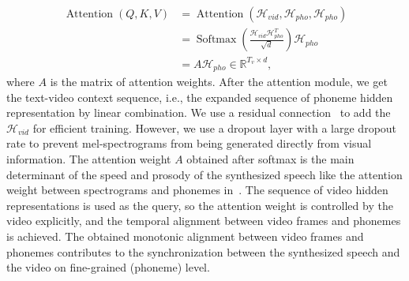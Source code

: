 \documentclass{article}
\begin{document}
\vspace{-0.5cm}
\begin{align}
\label{eq:att}
\operatorname{Attention}(Q, K, V) 
&= \operatorname{Attention}\left(\mathcal{H}_{vid} , \mathcal{H}_{pho} , \mathcal{H}_{pho} \right) \\ 
&= \operatorname{Softmax}\left(\frac{\mathcal{H}_{vid}  \mathcal{H}_{pho} ^{T}}{\sqrt{d}}\right)\mathcal{H}_{pho} \\
&= A \mathcal{H}_{pho} \in \mathbb{R}^{T_v \times d},
\end{align}
where $A$ is the matrix of attention weights. After the attention module, we get the text-video context sequence, i.e., the expanded sequence of phoneme hidden representation by linear combination. 
We use a residual connection~\cite{he2016deep} to add the $\mathcal{H}_{vid}$ for efficient training. However, we use a dropout layer with a large dropout rate to prevent mel-spectrograms from being generated directly from visual information.
The attention weight $A$ obtained after softmax is the main determinant of the speed and prosody of the synthesized speech like the attention weight between spectrograms and phonemes in~\cite{wang2017tacotron, shen2018natural, li2019neural}. 
The sequence of video hidden representations is used as the query, so the attention weight is controlled by the video explicitly, and the temporal alignment between video frames and phonemes is achieved. The obtained monotonic alignment between video frames and phonemes contributes to the synchronization between the synthesized speech and the video on fine-grained (phoneme) level.
\end{document}
